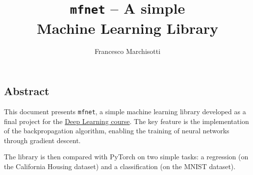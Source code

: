 \documentclass{unitothesis}
\author{Francesco Marchisotti}
\title{\centering\texttt{mfnet} -- A simple\\[0.5em] Machine Learning Library}
\begin{document}
\maketitlepage
\thispagestyle{empty}
\subsection*{\centering Abstract}
This document presents \texttt{mfnet}, a simple machine learning library developed as a final project for the \href{https://fisica-sc.campusnet.unito.it/do/storicocorsi.pl/Show?_id=curx_2324}{Deep Learning course}. The key feature is the implementation of the backpropagation algorithm, enabling the training of neural networks through gradient descent.

The library is then compared with PyTorch on two simple tasks: a regression (on the California Housing dataset) and a classification (on the MNIST dataset).
\newpage

{\hypersetup{linkcolor=black}\tableofcontents}






% 
% 
% 
% 



% 
\end{document}
